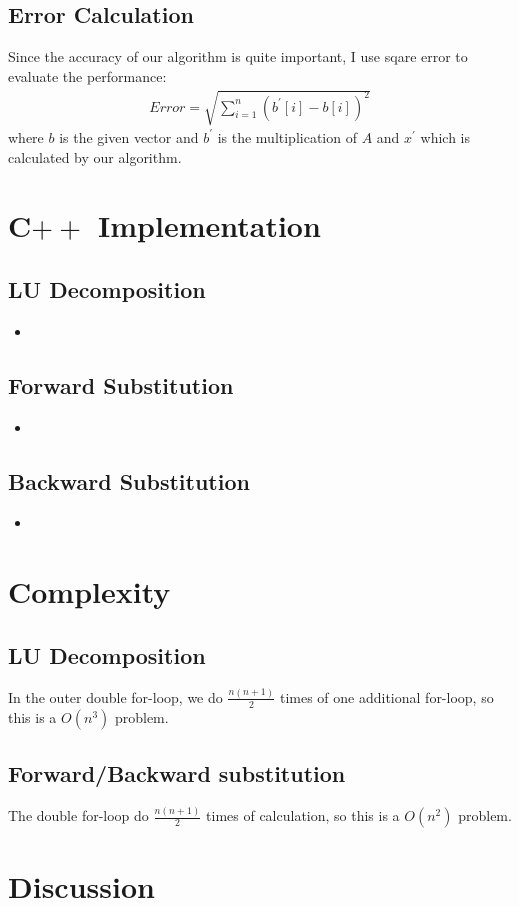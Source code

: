 \documentclass{article}
\newcommand{\cppscript}[1]{
    \begin{itemize}
        \item[]
    \end{itemize}
}
\begin{document}
\subsection{Error Calculation}
Since the accuracy of our algorithm is quite important, I use sqare error to evaluate the performance:
\begin{gather}
    Error = \sqrt{\sum_{i=1}^{n}(b^{'}[i] - b[i])^2}
\end{gather}
where $b$ is the given vector and $b^{'}$ is the multiplication of $A$ and $x^{'}$ which is calculated by our algorithm.

\newpage

\section{C$++$ Implementation}
\subsection{LU Decomposition}
\cppscript{src/luFact.cpp}
\subsection{Forward Substitution}
\cppscript{src/fwdSubs.cpp}
\subsection{Backward Substitution}
\cppscript{src/bckSubs.cpp}

\section{Complexity}
\subsection{LU Decomposition}
In the outer double for-loop, we do $\frac{n(n+1)}{2}$ times of one additional for-loop, so this is a {\boldmath$O(n^3)$} problem.
\subsection{Forward/Backward substitution}
The double for-loop do $\frac{n(n+1)}{2}$ times of calculation, so this is a {\boldmath$O(n^2)$} problem.

\section{Discussion}
\end{document}
